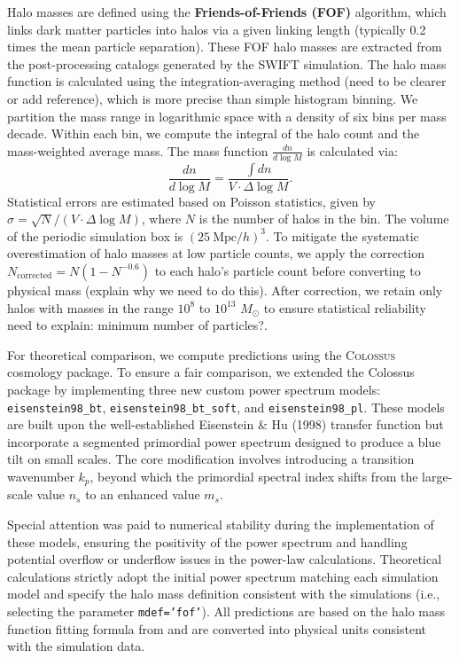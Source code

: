 \documentclass[
 reprint,
 superscriptaddress,
 nofootinbib,
 nobibnotes,
 amsmath,
 amssymb,
 aps,
 prd,
 floatfix,
 longbibliography
]{revtex4-1}
\begin{document}
Halo masses are defined using the \textbf{Friends-of-Friends (FOF)} algorithm, which links dark matter particles into halos via a given linking length (typically 0.2 times the mean particle separation). These FOF halo masses are extracted from the post-processing catalogs generated by the \textsc{SWIFT} simulation. The halo mass function is calculated using the integration-averaging method {\color{red} (need to be clearer or add reference)}, which is more precise than simple histogram binning. We partition the mass range in logarithmic space with a density of six bins per mass decade. Within each bin, we compute the integral of the halo count and the mass-weighted average mass. The mass function $\frac{dn}{d\log M}$ is calculated via:
\begin{equation}
\frac{dn}{d\log M} = \frac{\int dn}{V \cdot \Delta \log M}.
\end{equation}
Statistical errors are estimated based on Poisson statistics, given by $\sigma = \sqrt{N}/(V \cdot \Delta \log M)$, where $N$ is the number of halos in the bin. The volume of the periodic simulation box is $(25\ \mathrm{Mpc}/h)^3$. To mitigate the systematic overestimation of halo masses at low particle counts, we apply the \protect\cite{Warren_2006}correction $N_{\text{corrected}} = N(1-N^{-0.6})$ to each halo's particle count before converting to physical mass {\color{red} (explain why we need to do this)}. After correction, we retain only halos with masses in the range $10^{8}$ to $10^{13}$ $M_\odot$ to ensure statistical reliability {\color{red} need to explain: minimum number of particles?}.

For theoretical comparison, we compute predictions using the \textsc{Colossus} cosmology package. To ensure a fair comparison, we extended the Colossus package by implementing three new custom power spectrum models: \texttt{eisenstein98\_bt}, \texttt{eisenstein98\_bt\_soft}, and \texttt{eisenstein98\_pl}. These models are built upon the well-established Eisenstein \& Hu (1998) transfer function but incorporate a segmented primordial power spectrum designed to produce a blue tilt on small scales. The core modification involves introducing a transition wavenumber $k_p$, beyond which the primordial spectral index shifts from the large-scale value $n_s$ to an enhanced value $m_s$.

Special attention was paid to numerical stability during the implementation of these models, ensuring the positivity of the power spectrum and handling potential overflow or underflow issues in the power-law calculations. Theoretical calculations strictly adopt the initial power spectrum matching each simulation model and specify the halo mass definition consistent with the simulations (i.e., selecting the parameter \texttt{mdef='fof'}). All predictions are based on the halo mass function fitting formula from \protect\cite{Reed_2007} and are converted into physical units consistent with the simulation data.
\end{document}
